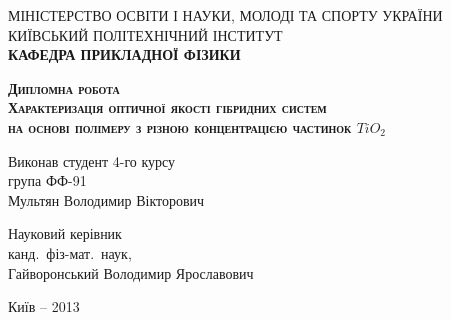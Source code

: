 \begin{titlepage}
\begin{center}
МІНІСТЕРСТВО ОСВІТИ І НАУКИ, МОЛОДІ ТА СПОРТУ УКРАЇНИ \\
\vspace{1em}
КИЇВСЬКИЙ ПОЛІТЕХНІЧНИЙ ІНСТИТУТ\\
\vspace{2em}
\textbf{КАФЕДРА ПРИКЛАДНОЇ ФІЗИКИ}
\end{center}
\vspace{5em}

\begin{center}
\Large{\textbf{\textsc{Дипломна робота}}}\\  
\LARGE{\textsc{\textbf{Характеризація оптичної якості гібридних систем\\ на основі полімеру з різною концентрацією частинок $TiO_2$}}}
\end{center}

\vspace{2em}

\begin{flushleft}
\hspace{8cm}Виконав студент 4-го курсу\\
\hspace{8cm}група ФФ-91\\
\hspace{8cm}Мультян Володимир Вікторович\\

\vspace{2em}

\hspace{8cm}Науковий керівник\\
\hspace{8cm}канд.~фіз-мат.~наук,\\
\hspace{8cm}Гайворонський Володимир Ярославович\\

\end{flushleft} 

\vspace{\fill}

\begin{center}
Київ -- 2013
\end{center}				
\end{titlepage}
%
